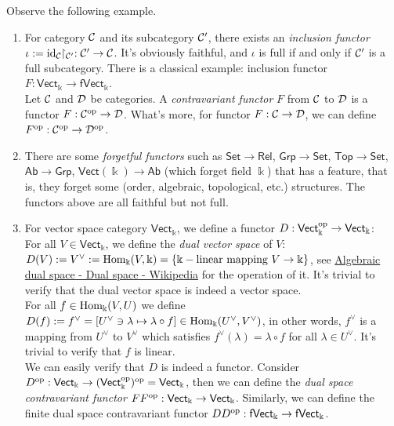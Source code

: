 \documentclass{article}
\begin{document}
\begin{exm}\label{func}
	Observe the following example.
	\begin{enumerate}
		\item For category $\mathcal{C}$ and its subcategory $\mathcal{C}'$, there exists an \emph{inclusion functor} $\iota:=\mathrm{id}_{\mathcal{C}}\!\!\upharpoonright_{\mathcal{C}'}:\mathcal{C}'\to\mathcal{C}$. It's obviously faithful, and $\iota$ is full if and only if $\mathcal{C}'$ is a full subcategory. There is a classical example: inclusion functor $F:\mathsf{Vect}_\Bbbk\to\mathsf{fVect}_\Bbbk$.\\
		Let $\mathcal{C}$ and $\mathcal{D}$ be categories. A \emph{contravariant functor} $F$ from $\mathcal{C}$ to $\mathcal{D}$ is a functor $F:\mathcal{C}^\mathrm{op}\to\mathcal{D}$. What's more, for functor $F:\mathcal{C}\to\mathcal{D}$, we can define $F^\mathrm{op}:\mathcal{C}^\mathrm{op}\to\mathcal{D}^\mathrm{op}$.
		
		\item There are some \emph{forgetful functors} such as $\mathsf{Set}\to\mathsf{Rel}$, $\mathsf{Grp}\to\mathsf{Set}$, $\mathsf{Top}\to\mathsf{Set}$, $\mathsf{Ab}\to\mathsf{Grp}$, $\mathsf{Vect}(\Bbbk)\to\mathsf{Ab}$ (which forget field $\Bbbk$) that has a feature, that is, they forget some (order, algebraic, topological, etc.) structures. The functors above are all faithful but not full.
		
		\item For vector space category $\mathsf{Vect}_\Bbbk$, we define a functor $D:\mathsf{Vect}^\mathrm{op}_\Bbbk\to\mathsf{Vect}_\Bbbk$:\\
		For all $V\in\mathsf{Vect}_\Bbbk$, we define the \emph{dual vector space} of $V$: $D(V):=V^\vee:=\mathrm{Hom}_\Bbbk(V,\Bbbk)=\{\Bbbk-\text{linear mapping}\ V\to\Bbbk\}$, see \href{https://en.wikipedia.org/wiki/Dual_space#Algebraic_dual_space}{Algebraic dual space - Dual space - Wikipedia} for the operation of it. It's trivial to verify that the dual vector space is indeed a vector space.\\
		For all $f\in\mathrm{Hom}_\Bbbk(V,U)$ we define $D(f):=f^\vee=[U^\vee\ni\lambda\mapsto\lambda\circ f]\in\mathrm{Hom}_\Bbbk(U^\vee,V^\vee)$, in other words, $f^\vee$ is a mapping from $U^\vee$ to $V^\vee$ which satisfies $f^\vee(\lambda)=\lambda\circ f$ for all $\lambda\in U^\vee$. It's trivial to verify that $f$ is linear.\\
		We can easily verify that $D$ is indeed a functor. Consider $D^\mathrm{op}:\mathsf{Vect}_\Bbbk\to(\mathsf{Vect}^\mathrm{op}_\Bbbk)^\mathrm{op}=\mathsf{Vect}_\Bbbk$, then we can define the \emph{dual space contravariant functor} $FF^\mathrm{op}:\mathsf{Vect}_\Bbbk\to\mathsf{Vect}_\Bbbk$. Similarly, we can define the finite dual space contravariant functor $DD^\mathrm{op}:\mathsf{fVect}_\Bbbk\to\mathsf{fVect}_\Bbbk$.
	\end{enumerate}
\end{exm}
\end{document}
